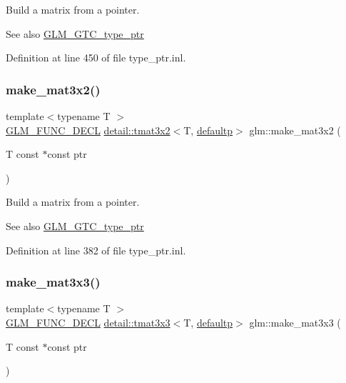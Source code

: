 Build a matrix from a pointer. \begin{DoxySeeAlso}{See also}
\hyperlink{group__gtc__type__ptr}{G\+L\+M\+\_\+\+G\+T\+C\+\_\+type\+\_\+ptr} 
\end{DoxySeeAlso}


Definition at line 450 of file type\+\_\+ptr.\+inl.

\mbox{\label{group__gtc__type__ptr_gaa40868af4de8c5ed5470fdcc9985dbfc}} 
\subsubsection{\texorpdfstring{make\+\_\+mat3x2()}{make\_mat3x2()}}
{\footnotesize\ttfamily template$<$typename T $>$ \\
\hyperlink{setup_8hpp_ab2d052de21a70539923e9bcbf6e83a51}{G\+L\+M\+\_\+\+F\+U\+N\+C\+\_\+\+D\+E\+CL} \hyperlink{structglm_1_1detail_1_1tmat3x2}{detail\+::tmat3x2}$<$T, \hyperlink{namespaceglm_a0f04f086094c747d227af4425893f545a9d21ccd8b5a009ec7eb7677befc3bf51}{defaultp}$>$ glm\+::make\+\_\+mat3x2 (\begin{DoxyParamCaption}\item[{T const $\ast$const}]{ptr }\end{DoxyParamCaption})}

Build a matrix from a pointer. \begin{DoxySeeAlso}{See also}
\hyperlink{group__gtc__type__ptr}{G\+L\+M\+\_\+\+G\+T\+C\+\_\+type\+\_\+ptr} 
\end{DoxySeeAlso}


Definition at line 382 of file type\+\_\+ptr.\+inl.

\mbox{\label{group__gtc__type__ptr_gaf8ba0a0a523423ae1149a1c2d90eb337}} 
\subsubsection{\texorpdfstring{make\+\_\+mat3x3()}{make\_mat3x3()}}
{\footnotesize\ttfamily template$<$typename T $>$ \\
\hyperlink{setup_8hpp_ab2d052de21a70539923e9bcbf6e83a51}{G\+L\+M\+\_\+\+F\+U\+N\+C\+\_\+\+D\+E\+CL} \hyperlink{structglm_1_1detail_1_1tmat3x3}{detail\+::tmat3x3}$<$T, \hyperlink{namespaceglm_a0f04f086094c747d227af4425893f545a9d21ccd8b5a009ec7eb7677befc3bf51}{defaultp}$>$ glm\+::make\+\_\+mat3x3 (\begin{DoxyParamCaption}\item[{T const $\ast$const}]{ptr }\end{DoxyParamCaption})}

